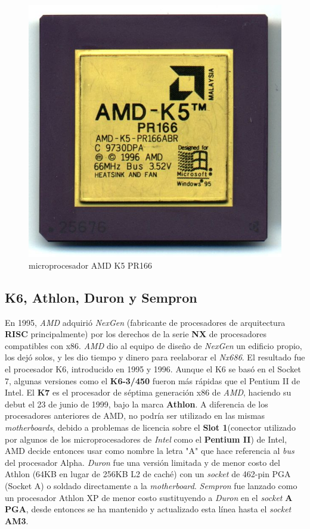 \begin{figure}[htb]
	\centering
	\includegraphics[scale = 0.2]{Graphics/amd-k5 PR166.jpg}
	\caption{microprocesador AMD K5 PR166}
	\label{fig:27}
\end{figure}

\subsection{K6, Athlon, Duron y Sempron}
En 1995, \emph{AMD} adquirió \emph{NexGen} (fabricante de procesadores de arquitectura \textbf{RISC} principalmente) por los derechos de la serie \textbf{NX} de procesadores compatibles con x86. 
\emph{AMD} dio al equipo de diseño de \emph{NexGen} un edificio propio, los dejó solos, y les dio tiempo y dinero para reelaborar el \emph{Nx686}. El resultado fue el procesador K6, 
introducido en 1995 y 1996. Aunque el K6 se basó en el Socket 7, algunas versiones como el \textbf{K6-3/450} fueron más rápidas que el Pentium II de Intel. 
El \textbf{K7} es el procesador de séptima generación x86 de \emph{AMD}, haciendo su debut el 23 de junio de 1999, bajo la marca \textbf{Athlon}. A diferencia de los procesadores anteriores de AMD, 
no podría ser utilizado en las mismas \emph{motherboards}, debido a problemas de licencia sobre el \textbf{Slot 1}(conector utilizado por algunos de los microprocesadores de \emph{Intel} como el \textbf{Pentium II})  
de Intel, AMD decide entonces usar como nombre la letra "A" que hace referencia al \emph{bus} del procesador Alpha. \emph{Duron} fue una versión limitada y de menor costo del Athlon (64KB en 
lugar de 256KB L2 de caché) con un \emph{socket} de 462-pin PGA (Socket A) o soldado directamente a la \emph{motherboard}. \emph{Sempron} fue lanzado como un procesador Athlon XP de menor 
costo sustituyendo a \emph{Duron} en el \emph{socket} \textbf{A PGA}, desde entonces se ha mantenido y actualizado esta línea hasta el \emph{socket} \textbf{AM3}. 
